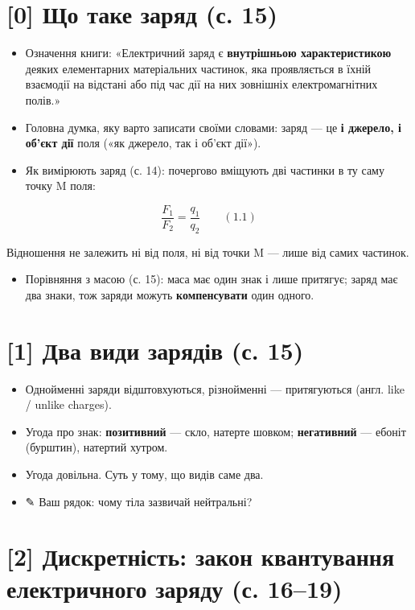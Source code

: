 \documentclass[11pt,a4paper,oneside]{book}
\newcommand{\pen}{{\sffamily\color{accent}✎}}
\begin{document}
\par\noindent{\color{accent!30}\rule{\linewidth}{0.4pt}}\par

\section*{[0] Що таке заряд (с. 15)}

\begin{itemize}
\item Означення книги: «Електричний заряд є \textbf{внутрішньою характеристикою} деяких елементарних матеріальних частинок, яка проявляється в їхній взаємодії на відстані або під час дії на них зовнішніх електромагнітних полів.»
\item Головна думка, яку варто записати своїми словами: заряд — це \textbf{і джерело, і об'єкт дії} поля («як джерело, так і об'єкт дії»).
\item Як вимірюють заряд (с. 14): почергово вміщують дві частинки в ту саму точку M поля:
\end{itemize}

\[\frac{F_1}{F_2} = \frac{q_1}{q_2} \qquad (1.1)\]

Відношення не залежить ні від поля, ні від точки M — лише від самих частинок.
\begin{itemize}
\item Порівняння з масою (с. 15): маса має один знак і лише притягує; заряд має два знаки, тож заряди можуть \textbf{компенсувати} один одного.
\end{itemize}

\section*{[1] Два види зарядів (с. 15)}

\begin{itemize}
\item Однойменні заряди відштовхуються, різнойменні — притягуються (англ. like / unlike charges).
\item Угода про знак: \textbf{позитивний} — скло, натерте шовком; \textbf{негативний} — ебоніт (бурштин), натертий хутром.
\item Угода довільна. Суть у тому, що видів саме два.
\item \pen{} Ваш рядок: чому тіла зазвичай нейтральні?
\end{itemize}

\section*{[2] Дискретність: закон квантування електричного заряду (с. 16–19)}
\end{document}
